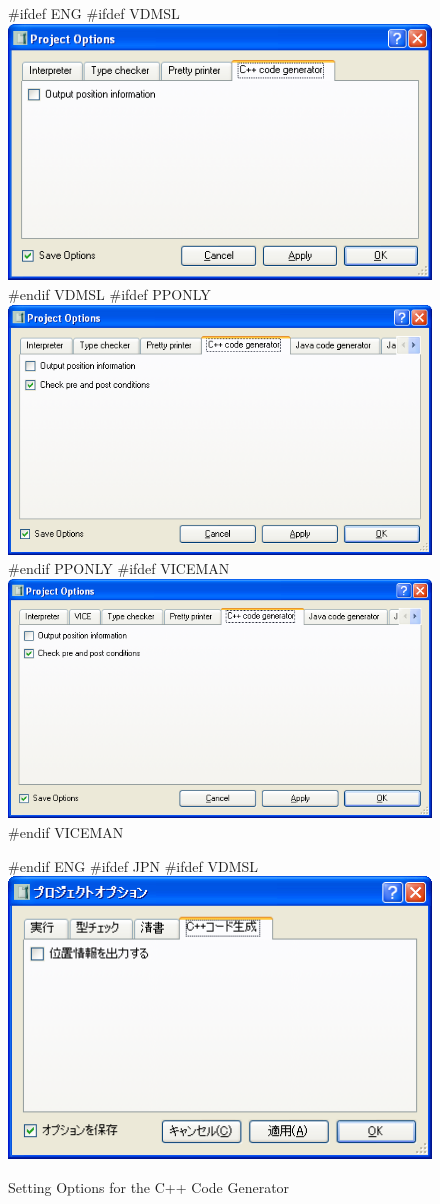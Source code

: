 \documentclass[\pformat,12pt]{article}
\begin{document}
\begin{figure}[tbh]
\begin{center}
#ifdef ENG
#ifdef VDMSL
\includegraphics[width=12cm]{ccgOptions-slENG.png}
#endif VDMSL
#ifdef PPONLY
\includegraphics[width=12cm]{ccgOptions-ppENG.png}
#endif PPONLY
#ifdef VICEMAN
\includegraphics[width=12cm]{ccgOptions-viceENG.png}
#endif VICEMAN
\caption{Setting Options for the C++ Code Generator}
#endif ENG
#ifdef JPN
#ifdef VDMSL
\includegraphics[width=12cm]{ccgOptions-sl.png}

\end{center}
\end{figure}
\end{document}
